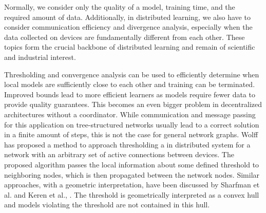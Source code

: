 Normally, we consider only the quality of a model, training time, and the required amount of data. 
Additionally, in distributed learning, we also have to consider communication efficiency and divergence analysis, especially when the data collected on devices are fundamentally different from each other.
These topics form the crucial backbone of distributed learning and remain of scientific and industrial interest.

Thresholding and convergence analysis can be used to efficiently determine when local models are sufficiently close to each other and training can be terminated.
Improved bounds lead to more efficient learners as models require fewer data to provide quality guarantees.
This becomes an even bigger problem in decentralized architectures without a coordinator.
While communication and message passing for this application on tree-structured networks usually lead to a correct solution in a finite amount of steps, this is not the case for general network graphs.
Wolff \cite{wolff2013local} has proposed a method to approach thresholding a in distributed system for a network with an arbitrary set of active connections between devices.
The proposed algorithm passes the local information about some defined threshold to neighboring nodes, which is then propagated between the network nodes. 
Similar approaches, with a geometric interpretation, have been discussed by Sharfman et al. \cite{sharfman2007geometric} and Keren et al., \cite{keren2011shape}. 
The threshold is geometrically interpreted as a convex hull and models violating the threshold are not contained in this hull. 
